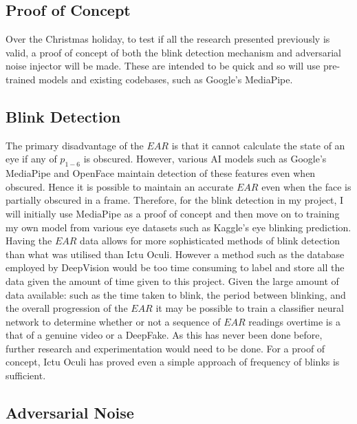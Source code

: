 \documentclass{article}
\begin{document}
\subsection{Proof of Concept}

Over the Christmas holiday, to test if all the research presented previously is valid, a proof of concept of both the blink detection mechanism and adversarial noise injector will be made. These are intended to be quick and so will use pre-trained models and existing codebases, such as Google's MediaPipe\cite{mediapipe}. 

\subsection{Blink Detection} \label{sec:future-blink}

The primary disadvantage of the $EAR$ is that it cannot calculate the state of an eye if any of $p_{1-6}$ is obscured\cite{ictuoculi}. However, various AI models such as Google's MediaPipe \cite{mediapipe} and OpenFace\cite{openface} maintain detection of these features even when obscured. Hence it is possible to maintain an accurate $EAR$ even when the face is partially obscured in a frame. Therefore, for the blink detection in my project, I will initially use MediaPipe as a proof of concept and then move on to training my own model from various eye datasets such as Kaggle's eye blinking prediction\cite{eyeblinkprediction}.\\

Having the $EAR$ data allows for more sophisticated methods of blink detection than what was utilised than Ictu Oculi. However a method such as the database employed by DeepVision\cite{blinking-pattern} would be too time consuming to label and store all the data given the amount of time given to this project. Given the large amount of data available: such as the time taken to blink, the period between blinking, and the overall progression of the $EAR$ it may be possible to train a classifier neural network to determine whether or not a sequence of $EAR$ readings overtime is a that of a genuine video or a DeepFake. As this has never been done before, further research and experimentation would need to be done. For a proof of concept, Ictu Oculi has proved even a simple approach of frequency of blinks is sufficient\cite{ictuoculi}.

\subsection{Adversarial Noise} \label{sec:future-noise}
\end{document}
